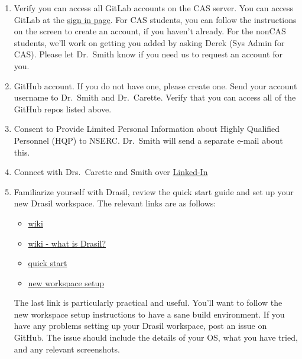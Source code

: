 \documentclass[12pt]{article}
\begin{document}
\begin{enumerate}

\item Verify you can access all GitLab accounts on the CAS server.  You can
access GitLab at the \href{https://gitlab.cas.mcmaster.ca/users/sign_in} {sign
in page}.  For CAS students, you can follow the instructions on the screen to
create an account, if you haven't already.  For the nonCAS students, we'll work
on getting you added by asking Derek (Sys Admin for CAS).  Please let Dr.\ Smith
know if you need us to request an account for you.

\item GitHub account.  If you do not have one, please create one.  Send your
account username to Dr.\ Smith and Dr.\ Carette.  Verify that you can access all
of the GitHub repos listed above.

\item Consent to Provide Limited Personal Information about Highly Qualified
Personnel (HQP) to NSERC.  Dr.\ Smith will send a separate e-mail about this.

\item Connect with Drs.\ Carette and Smith over \href{https://www.linkedin.com/}
{Linked-In}

\item Familiarize yourself with Drasil, review the quick start guide and set up
your new Drasil workspace.  The relevant links are as follows:

\begin{itemize}

\item \href{https://github.com/JacquesCarette/Drasil/wiki} {wiki}

\item \href{https://github.com/JacquesCarette/Drasil/wiki#what-is-drasil-cont}
{wiki - what is Drasil?}

\item \href{https://github.com/JacquesCarette/Drasil#quick-start} {quick start}

\item \href{https://github.com/JacquesCarette/Drasil/wiki/New-Workspace-Setup}
{new workspace setup}

\end{itemize}

The last link is particularly practical and useful.  You'll want to follow the
new workspace setup instructions to have a sane build environment.  If you have
any problems setting up your Drasil workspace, post an issue on GitHub.  The
issue should include the details of your OS, what you have tried, and any
relevant screenshots.


\end{enumerate}
\end{document}

